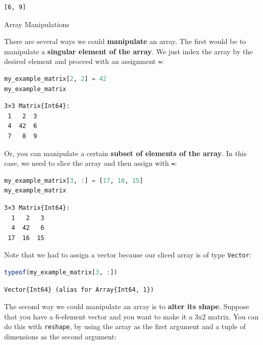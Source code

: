 \documentclass[
  notoc %
]{tufte-book}
\makeatletter
\newcommand{\passthrough}[1]{#1}
\renewcommand\subsubsection{%
\@startsection{subsubsection}{3}{\z@ }{-3.25ex\@plus -1ex \@minus -.2ex}{1.5ex \@plus .2ex}{\normalfont \normalsize \bfseries }
}
\makeatother
\begin{document}
\begin{lstlisting}[language=Output]
[6, 9]
\end{lstlisting}

\hypertarget{sec:array_manipulation}{%
\subsubsection{Array Manipulations}\label{sec:array_manipulation}}

There are several ways we could \textbf{manipulate} an array. The first
would be to manipulate a \textbf{singular element of the array}. We just
index the array by the desired element and proceed with an assignment
\passthrough{\lstinline!=!}:

\begin{lstlisting}[language=Julia]
my_example_matrix[2, 2] = 42
my_example_matrix
\end{lstlisting}

\begin{lstlisting}[language=Output]
3×3 Matrix{Int64}:
 1   2  3
 4  42  6
 7   8  9
\end{lstlisting}

Or, you can manipulate a certain \textbf{subset of elements of the
array}. In this case, we need to slice the array and then assign with
\passthrough{\lstinline!=!}:

\begin{lstlisting}[language=Julia]
my_example_matrix[3, :] = [17, 16, 15]
my_example_matrix
\end{lstlisting}

\begin{lstlisting}[language=Output]
3×3 Matrix{Int64}:
  1   2   3
  4  42   6
 17  16  15
\end{lstlisting}

Note that we had to assign a vector because our sliced array is of type
\passthrough{\lstinline!Vector!}:

\begin{lstlisting}[language=Julia]
typeof(my_example_matrix[3, :])
\end{lstlisting}

\begin{lstlisting}[language=Output]
Vector{Int64} (alias for Array{Int64, 1})
\end{lstlisting}

The second way we could manipulate an array is to \textbf{alter its
shape}. Suppose that you have a 6-element vector and you want to make it
a 3x2 matrix. You can do this with \passthrough{\lstinline!reshape!}, by
using the array as the first argument and a tuple of dimensions as the
second argument:
\end{document}
